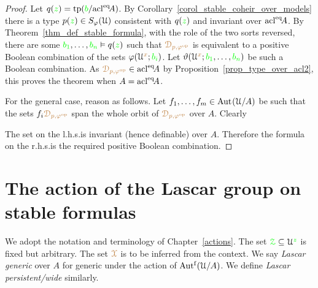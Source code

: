 \begin{proof}
  Let $q({\color{green} z})={\rm tp}({\color{green} b}/{\rm acl}^{{\rm eq}}\!A)$.
  By Corollary~\ref{corol_stable_coheir_over_models} there is a type $p({\color{green} z})\in S_\varphi(\EuScript U)$ consistent with $q({\color{green} z})$ and invariant over ${\rm acl}^{{\rm eq}}\!A$.
  By Theorem~\ref{thm_def_stable_formula}, with the role of the two sorts reversed, there are some ${\color{green} b_1},\dots,{\color{green} b_n}\vDash q({\color{green} z})$ such that ${\color{brown}\EuScript D_{p,\varphi^{\rm op}}}$ is equivalent to a positive Boolean combination of the sets $\varphi(\EuScript U^{\color{brown} x};{\color{green} b_i})$.
  Let $\vartheta(\EuScript U^{\color{brown} x};{\color{green} b_1},\dots,{\color{green} b_n})$ be such a Boolean combination.
  As ${\color{brown}\EuScript D_{p,\varphi^{\rm op}}}\in{\rm acl}^{{\rm eq}}\!A$ by Proposition~\ref{prop_type_over_acl2}, this proves the theorem when $A={\rm acl}^{{\rm eq}}\!A$.

  For the general case, reason as follows.
  Let $f_1,\dots,f_m\in{\rm Aut\kern.15ex}(\EuScript U/A)$ be such that the sets $f_i{\color{brown}\EuScript D_{p,\varphi^{\rm op}}}$ span the whole orbit of ${\color{brown}\EuScript D_{p,\varphi^{\rm op}}}$ over $A$.
  Clearly


  The set on the l.h.s.\@ is invariant (hence definable) over $A$.
  Therefore the formula on the r.h.s.\@ is the required positive Boolean combination.
\end{proof}

\section{The action of the Lascar group on stable formulas}\label{Lascar_action}

\def\medrel#1{\parbox[t]{6ex}{$\displaystyle\hfil #1$}}
\def\ceq#1#2#3{\parbox{10ex}{$\displaystyle #1$}\medrel{#2}$\displaystyle  #3$}

We adopt the notation and terminology of Chapter~\ref{actions}. The set ${\color{green}\EuScript Z}\subseteq\EuScript U^{\color{green} z}$ is fixed but arbitrary.
The set ${\color{brown}\EuScript X}$ is to be inferred from the context.
We say \emph{Lascar generic\/} over $A$ for generic under the action of $\mbox{Aut$^{\rm f}$}(\EuScript U/A)$.
We define \emph{Lascar persistent/wide\/} similarly.

